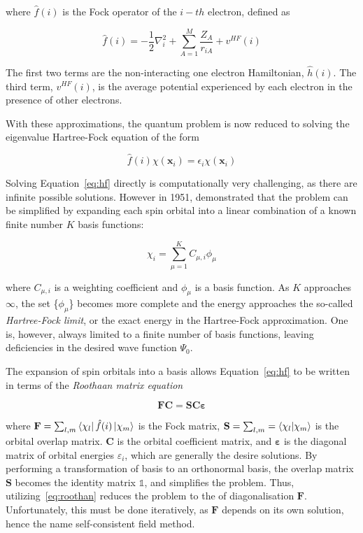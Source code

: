 \noindent where $\hat{f}(i)$ is the Fock operator of the $i-th$ electron,
defined as

\begin{equation}
  \hat{f}(i) = -\frac{1}{2}\nabla^2_i + \sum_{A=1}^M\frac{Z_A}{r_{iA}} + v^{HF}(i)
\end{equation}

\noindent The first two terms are the non-interacting one electron Hamiltonian,
$\hat{h}(i)$. The third term, $v^{HF}(i)$, is the average potential experienced
by each electron in the presence of other electrons.

With these approximations, the quantum problem is now reduced to solving the
eigenvalue Hartree-Fock equation of the form

\begin{equation}
\hat{f}(i)\chi(\mathbf{x}_i) = \epsilon_i\chi(\mathbf{x}_i)
\label{eq:hf}
\end{equation}

Solving Equation~\ref{eq:hf} directly is computationally very challenging, as
there are infinite possible solutions.  However in 1951, \citet{Roothaan1951}
demonstrated that the problem can be simplified by expanding each spin orbital
into a linear combination of a known finite number $K$ basis functions:

\begin{equation}
\chi_i = \sum_{\mu=1}^K C_{\mu,i}\phi_{\mu}
\end{equation}

\noindent where $C_{\mu,i}$ is a weighting coefficient and $\phi_{\mu}$ is a
basis function. As $K$ approaches $\infty$, the set \{$\phi_{\mu}$\} becomes
more complete and the energy approaches the so-called \emph{Hartree-Fock
limit}, or the exact energy in the Hartree-Fock approximation. One is, however,
always limited to a finite number of basis functions, leaving deficiencies in
the desired wave function $\Psi_0$.

The expansion of spin orbitals into a basis allows Equation~\ref{eq:hf} to be
written in terms of the \emph{Roothaan matrix equation}

\begin{equation}
\mathbf{F}\mathbf{C} = \mathbf{S}\mathbf{C}\mathbf{\varepsilon}
\label{eq:roothan}
\end{equation}

\noindent where $\mathbf{F} = \sum_{l,m} \bra{\chi_l} \hat{f}(i) \ket{\chi_m}$
is the Fock matrix, $\mathbf{S} = \sum_{l,m} = \bra{\chi_l}\ket{\chi_m}$ is the
orbital overlap matrix. $\mathbf{C}$ is the orbital coefficient matrix, and
$\mathbf{\varepsilon}$ is the diagonal matrix of orbital energies
$\varepsilon_i$, which are generally the desire solutions. By performing a
transformation of basis to an orthonormal basis, the overlap matrix
$\mathbf{S}$ becomes the identity matrix $\mathbb{1}$, and simplifies the
problem. Thus, utilizing~\ref{eq:roothan} reduces the problem to the of
diagonalisation $\mathbf{F}$. Unfortunately, this must be done iteratively, as
$\mathbf{F}$ depends on its own solution, hence the name self-consistent field
method.

